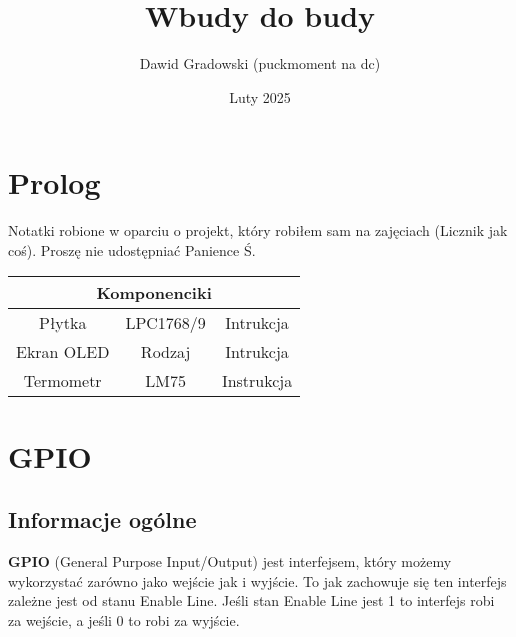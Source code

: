 \documentclass[11pt]{article}
\title{Wbudy do budy}
\author{Dawid Gradowski (puckmoment na dc)}
\date{Luty 2025}
\begin{document}
\maketitle
\renewcommand\contentsname{Spis treści}
\tableofcontents
\newpage
\section{Prolog}
Notatki robione w oparciu o projekt, który robiłem sam na zajęciach (Licznik jak coś).
Proszę nie udostępniać Panience Ś.

\begin{center}
    \begin{tabular}{ |c|c|c| }
        \hline
        \multicolumn{3}{|c|}{Komponenciki}\\
        \hline
        Płytka & LPC1768/9 & Intrukcja \\ 
        \hline
        Ekran OLED & Rodzaj & Intrukcja \\
        \hline
        Termometr & LM75 & Instrukcja \\
        \hline  
    \end{tabular}
\end{center}
\section{GPIO}
\subsection{Informacje ogólne}
\textbf{GPIO} (General Purpose Input/Output) jest interfejsem, który 
możemy wykorzystać zarówno jako wejście jak i wyjście. To jak zachowuje się 
ten interfejs zależne jest od stanu Enable Line. Jeśli stan Enable Line jest
1 to interfejs robi za wejście, a jeśli 0 to robi za wyjście.
\end{document}
